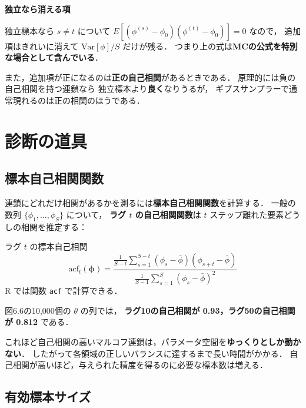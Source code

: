 \documentclass[lualatex,ja=standard,a4paper,12pt]{bxjsarticle}
\begin{document}
\begin{pointbox}
\textbf{独立なら消える項}

独立標本なら $s \ne t$ について
$E[(\phi^{(s)} - \phi_0)(\phi^{(t)} - \phi_0)] = 0$ なので，
追加項はきれいに消えて $\mathrm{Var}[\phi]/S$ だけが残る．
つまり上の式は\textbf{MCの公式を特別な場合として含んでいる}．

\medskip
また，追加項が正になるのは\textbf{正の自己相関}があるときである．
原理的には負の自己相関を持つ連鎖なら
独立標本より\textbf{良く}なりうるが，
ギブスサンプラーで通常現れるのは正の相関のほうである．
\end{pointbox}

\section{診断の道具}

\subsection*{標本自己相関関数}

連鎖にどれだけ相関があるかを測るには\textbf{標本自己相関関数}を計算する．
一般の数列 $\{\phi_1, \ldots, \phi_S\}$ について，
\textbf{ラグ $t$ の自己相関関数}は $t$ ステップ離れた要素どうしの相関を推定する：

\begin{defbox}{ラグ $t$ の標本自己相関}
\[
  \mathrm{acf}_t(\boldsymbol{\phi})
  = \frac{\frac{1}{S-t}\sum_{s=1}^{S-t}(\phi_s - \bar{\phi})(\phi_{s+t} - \bar{\phi})}
         {\frac{1}{S-1}\sum_{s=1}^{S}(\phi_s - \bar{\phi})^2}
\]
R では関数 \texttt{acf} で計算できる．
\end{defbox}

\noindent 図6.6の10,000個の $\theta$ の列では，
\textbf{ラグ10の自己相関が 0.93，ラグ50の自己相関が 0.812} である．

\begin{warningbox}
これほど自己相関の高いマルコフ連鎖は，パラメータ空間を\textbf{ゆっくりとしか動かない}．
したがって各領域の正しいバランスに達するまで長い時間がかかる．
自己相関が高いほど，与えられた精度を得るのに必要な標本数は増える．
\end{warningbox}

\subsection*{有効標本サイズ}
\end{document}
